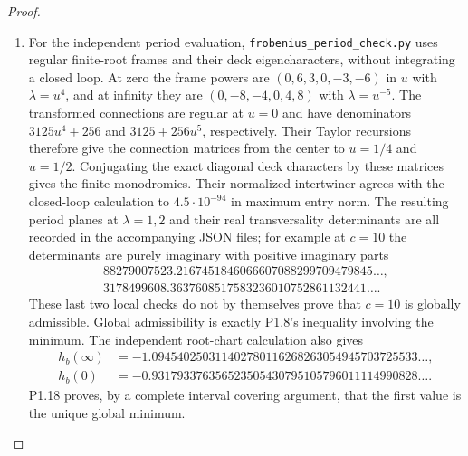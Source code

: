 \documentclass[11pt,a4paper]{article}
\theoremstyle{definition}
\begin{document}
\begin{proof}
\begin{enumerate}[label=\arabic*.]
\item For the independent period evaluation,
\texttt{frobenius\_period\_check.py} uses regular finite-root frames
and their deck eigencharacters, without integrating a closed loop.
At zero the frame powers are $(0,6,3,0,-3,-6)$ in $u$ with
$\lambda=u^4$, and at infinity they are
$(0,-8,-4,0,4,8)$ with $\lambda=u^{-5}$.
The transformed connections are regular at $u=0$ and have denominators
$3125u^4+256$ and $3125+256u^5$, respectively.
Their Taylor recursions therefore give the connection matrices from
the center to $u=1/4$ and $u=1/2$.  Conjugating the exact diagonal
deck characters by these matrices gives the finite monodromies.
Their normalized intertwiner agrees with the closed-loop calculation
to $4.5\cdot10^{-94}$ in maximum entry norm.
The resulting period planes at $\lambda=1,2$ and their real
transversality determinants are all recorded in the accompanying
JSON files; for example at $c=10$ the determinants are purely imaginary
with positive imaginary parts
\[
\begin{gathered}
88279007523.2167451846066607088299709479845\ldots,\\
3178499608.3637608517583236010752861132441\ldots.
\end{gathered}
\]
These last two local checks do not by themselves prove that $c=10$
is globally admissible.  Global admissibility is exactly P1.8's
inequality involving the minimum.  The independent root-chart
calculation also gives
\[
\begin{split}
h_b(\infty)&=-1.094540250311402780116268263054945703725533\ldots,\\
h_b(0)&=-0.931793376356523505430795105796011114990828\ldots.
\end{split}
\]
P1.18 proves, by a complete interval covering argument, that the
first value is the unique global minimum.

\end{enumerate}
\end{proof}
\end{document}
